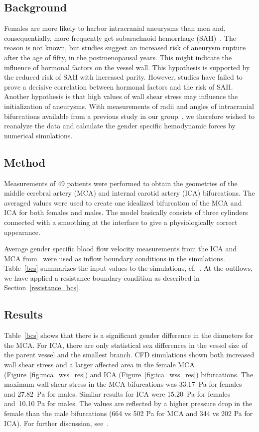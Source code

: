\subsection{Background}

Females are more likely to harbor intracranial aneurysms than men and,
consequentially, more frequently get subarachnoid hemorrhage
(SAH)~\cite{humphrey,eden}. The reason is not known, but studies
suggest an increased risk of aneurysm rupture after the age of fifty,
in the postmenopausal years. This might indicate the influence of
hormonal factors on the vessel wall. This hypothesis is supported by
the reduced risk of SAH with increased parity. However, studies have
failed to prove a decisive correlation between hormonal factors and
the risk of SAH. Another hypothesis is that high values of wall shear
stress may influence the initialization of aneurysms. With
measurements of radii and angles of intracranial bifurcations
available from a previous study in our group~\cite{tor}, we therefore
wished to reanalyze the data and calculate the gender specific
hemodynamic forces by numerical simulations.

\subsection{Method}

Measurements of 49 patients were performed to obtain the geometries of
the middle cerebral artery (MCA) and internal carotid artery (ICA)
bifurcations. The averaged values were used to create one idealized
bifurcation of the MCA and ICA for both females and males. The model
basically consists of three cylinders connected with a smoothing at
the interface to give a physiologically correct appearance.

Average gender specific blood flow velocity measurements from the ICA
and MCA from~\cite{krejza} were used as inflow boundary conditions in
the simulations. Table~\ref{bcs} summarizes the input values to the
simulations, cf.~\cite{kvs-sex}.  At the outflows, we have applied a
resistance boundary condition as described in
Section~\ref{resistance_bcs}.

\subsection{Results}

Table~\ref{bcs} shows that there is a significant gender difference in
the diameters for the MCA. For ICA,  there are only
statistical sex differences in the vessel size of the parent vessel
and the smallest branch. CFD simulations shown both increased wall
shear stress and a larger affected area in the female MCA
(Figure~\ref{fig:mca_wss_res}) and ICA (Figure~\ref{fig:ica_wss_res})
bifurcations. The maximum wall shear stress in the MCA bifurcations
was 33.17~Pa for females and 27.82~Pa for males. Similar results for
ICA were 15.20~Pa for females and~10.10 Pa for males. The values are
reflected by a higher pressure drop in the female than the male
bifurcations (664 vs 502 Pa for MCA and 344 vs 202 Pa for ICA). For
further discussion, see~\cite{kvs-sex}.

